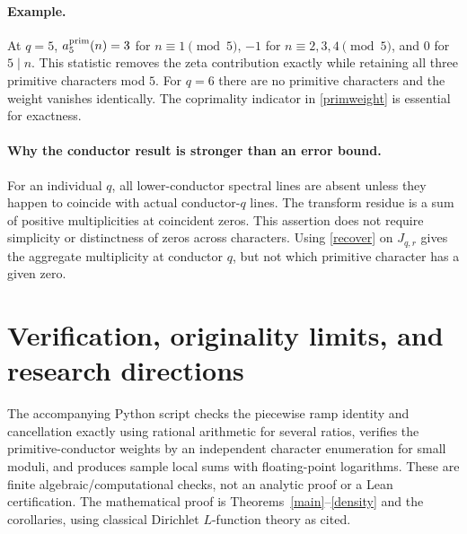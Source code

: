 \documentclass[11pt]{article}
\theoremstyle{remark}\newtheorem{remark}[theorem]{Remark}
\begin{document}
\paragraph{Example.} At $q=5$, $a_5^{\rm prim}(n)=3$ for $n\equiv1\pmod5$, $-1$ for $n\equiv2,3,4\pmod5$, and $0$ for $5\mid n$. This statistic removes the zeta contribution exactly while retaining all three primitive characters mod $5$. For $q=6$ there are no primitive characters and the weight vanishes identically. The coprimality indicator in \eqref{primweight} is essential for exactness.

\paragraph{Why the conductor result is stronger than an error bound.} For an individual $q$, all lower-conductor spectral lines are absent unless they happen to coincide with actual conductor-$q$ lines. The transform residue is a sum of positive multiplicities at coincident zeros. This assertion does not require simplicity or distinctness of zeros across characters. Using \eqref{recover} on $J_{q,r}$ gives the aggregate multiplicity at conductor $q$, but not which primitive character has a given zero.

\section{Verification, originality limits, and research directions}
The accompanying Python script checks the piecewise ramp identity and cancellation exactly using rational arithmetic for several ratios, verifies the primitive-conductor weights by an independent character enumeration for small moduli, and produces sample local sums with floating-point logarithms. These are finite algebraic/computational checks, not an analytic proof or a Lean certification. The mathematical proof is Theorems~\ref{main}--\ref{density} and the corollaries, using classical Dirichlet $L$-function theory as cited.
\end{document}
